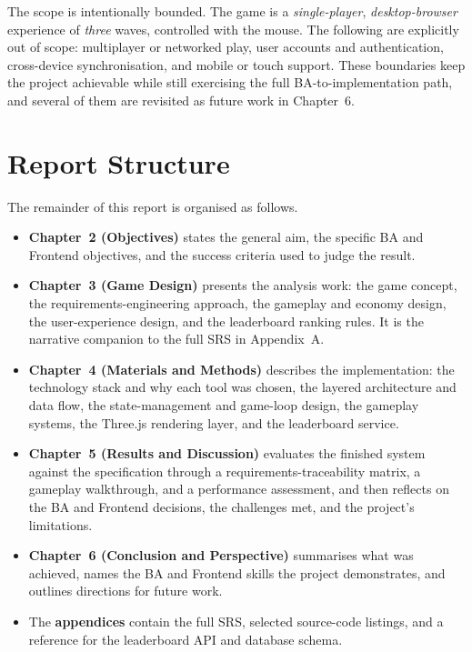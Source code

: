 The scope is intentionally bounded. The game is a \emph{single-player},
\emph{desktop-browser} experience of \emph{three} waves, controlled with the
mouse. The following are explicitly out of scope: multiplayer or networked play,
user accounts and authentication, cross-device synchronisation, and mobile or
touch support. These boundaries keep the project achievable while still
exercising the full BA-to-implementation path, and several of them are revisited
as future work in Chapter~6.

\section{Report Structure}

The remainder of this report is organised as follows.

\begin{itemize}
  \item \textbf{Chapter~2 (Objectives)} states the general aim, the specific BA
        and Frontend objectives, and the success criteria used to judge the
        result.
  \item \textbf{Chapter~3 (Game Design)} presents the analysis work: the game
        concept, the requirements-engineering approach, the gameplay and
        economy design, the user-experience design, and the leaderboard ranking
        rules. It is the narrative companion to the full SRS in Appendix~A.
  \item \textbf{Chapter~4 (Materials and Methods)} describes the implementation:
        the technology stack and why each tool was chosen, the layered
        architecture and data flow, the state-management and game-loop design,
        the gameplay systems, the Three.js rendering layer, and the leaderboard
        service.
  \item \textbf{Chapter~5 (Results and Discussion)} evaluates the finished
        system against the specification through a requirements-traceability
        matrix, a gameplay walkthrough, and a performance assessment, and then
        reflects on the BA and Frontend decisions, the challenges met, and the
        project's limitations.
  \item \textbf{Chapter~6 (Conclusion and Perspective)} summarises what was
        achieved, names the BA and Frontend skills the project demonstrates, and
        outlines directions for future work.
  \item The \textbf{appendices} contain the full SRS, selected source-code
        listings, and a reference for the leaderboard API and database schema.
\end{itemize}
